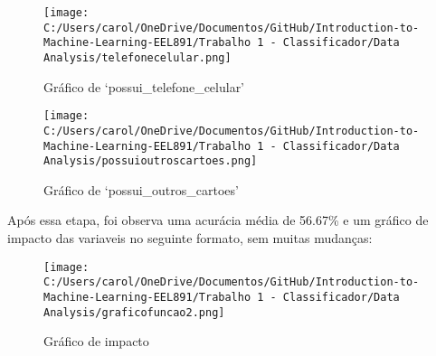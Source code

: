 \documentclass[11pt]{article}
\begin{document}
\begin{figure}
\centering
\texttt{[image: C:/Users/carol/OneDrive/Documentos/GitHub/Introduction-to-Machine-Learning-EEL891/Trabalho 1 - Classificador/Data Analysis/telefonecelular.png]}
\caption{Gráfico de `possui\_telefone\_celular'}
\end{figure}

\begin{figure}
\centering
\texttt{[image: C:/Users/carol/OneDrive/Documentos/GitHub/Introduction-to-Machine-Learning-EEL891/Trabalho 1 - Classificador/Data Analysis/possuioutroscartoes.png]}
\caption{Gráfico de `possui\_outros\_cartoes'}
\end{figure}

Após essa etapa, foi observa uma acurácia média de 56.67\% e um gráfico
de impacto das variaveis no seguinte formato, sem muitas mudanças:

\begin{figure}
\centering
\texttt{[image: C:/Users/carol/OneDrive/Documentos/GitHub/Introduction-to-Machine-Learning-EEL891/Trabalho 1 - Classificador/Data Analysis/graficofuncao2.png]}
\caption{Gráfico de impacto}
\end{figure}
\end{document}
